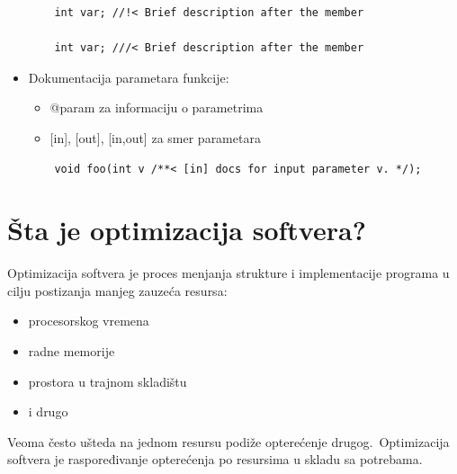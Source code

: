 \documentclass[a4paper]{article}
\begin{document}
\begin{itemize}
\begin{lstlisting}
    int var; //!< Brief description after the member 
  
    int var; ///< Brief description after the member\end{lstlisting}
    \item Dokumentacija parametara funkcije:
    \begin{itemize}
      \item @param za informaciju o parametrima
      \item {[in]}, [out], [in,out] za smer parametara
    \end{itemize}
    \begin{lstlisting}
    void foo(int v /**< [in] docs for input parameter v. */);\end{lstlisting}
    
  \end{itemize}
\section{Šta je optimizacija softvera?}
  Optimizacija softvera je proces menjanja strukture i implementacije programa u cilju postizanja 
  manjeg zauzeća resursa:
  \begin{itemize}
    \item procesorskog vremena
    \item radne memorije
    \item prostora u trajnom skladištu
    \item i drugo
  \end{itemize}
  Veoma često ušteda na jednom resursu podiže opterećenje drugog.\
  Optimizacija softvera je raspoređivanje opterećenja po resursima u skladu sa potrebama.
\end{document}
